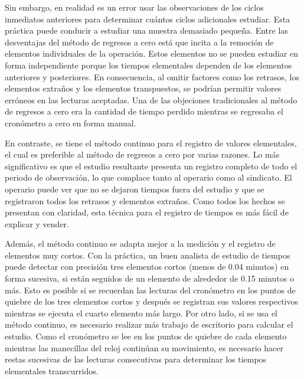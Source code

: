     
    
    Sin embargo, en realidad es un error usar las observaciones de los ciclos inmediatos anteriores para determinar cuántos ciclos adicionales estudiar. Esta práctica puede conducir a estudiar una muestra demasiado pequeña. Entre las desventajas del método de regresos a cero está que incita a la remoción de elementos individuales de la operación. Estos elementos no se pueden estudiar en forma independiente porque los tiempos elementales dependen de los elementos anteriores y posteriores. En consecuencia, al omitir factores como los retrasos, los elementos extraños y los elementos transpuestos, se podrían permitir valores erróneos en las lecturas aceptadas. Una de las objeciones tradicionales al método de regresos a cero era la cantidad de tiempo perdido mientras se regresaba el cronómetro a cero en forma manual.\cite{niebel1980ingenieria}
    
    
    
    
    
    En contraste, se tiene el método continuo para el registro de valores elementales, el cual es preferible al método de regresos a cero por varias razones. Lo más significativo es que el estudio resultante presenta un registro completo de todo el periodo de observación, lo que complace tanto al operario como al sindicato. El operario puede ver que no se dejaron tiempos fuera del estudio y que se registraron todos los retrasos y elementos extraños. Como todos los hechos se presentan con claridad, esta técnica para el registro de tiempos es más fácil de explicar y vender.\cite{niebel1980ingenieria}
    
    
    
    Además, el método continuo se adapta mejor a la medición y el registro de elementos muy cortos. Con la práctica, un buen analista de estudio de tiempos puede detectar con precisión tres elementos cortos (menos de 0.04 minutos) en forma sucesiva, si están seguidos de un elemento de alrededor de 0.15 minutos o más. Esto es posible si se recuerdan las lecturas del cronómetro en los puntos de quiebre de los tres elementos cortos y después se registran sus valores respectivos mientras se ejecuta el cuarto elemento más largo. Por otro lado, si se usa el método continuo, es necesario realizar más trabajo de escritorio para calcular el estudio. Como el cronómetro se lee en los puntos de quiebre de cada elemento mientras las manecillas del reloj continúan su movimiento, es necesario hacer restas sucesivas de las lecturas consecutivas para determinar los tiempos elementales transcurridos.\cite{niebel1980ingenieria}
    
